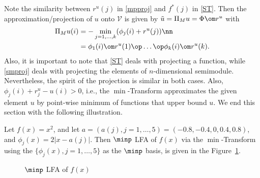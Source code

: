 Note the similarity between $r^u(j)$ in \eqref{mpproj} and $f^*(j)$ in \eqref{ST}.
Then the approximation/projection of $u$ onto $\mathcal{V}$ is given by $\tilde{u}=\Pi_M u=\Phi \om r^u$ with
\begin{align}\label{mplfa}
\Pi_M u(i)&=-\min_{j=1,\ldots,k}(\phi_j(i)+r^u(j))\nn\\
&=\phi_1(i) \om r^u(1)\op \ldots \op \phi_k(i) \om r^u(k).
\end{align}
Also, it is important to note that \eqref{ST} deals with projecting a function, while \eqref{smproj} deals with projecting the elements of $n$-dimensional semimodule. Nevertheless, the spirit of the projection is similar in both cases. Also, $\phi_j(i)+r^u_j -u(i)>0$, i.e., the $\min$-Transform approximates the given element $u$ by point-wise minimum of functions that upper bound $u$. We end this section with the following illustration.\\
\begin{example}
Let $f(x)=x^2$, and let $a=(a(j),j=1,\ldots,5)=(-0.8,-0.4,0,0.4,0.8)$, and $\phi_j(x)=2|x-a(j)|$. Then $\minp$ LFA of $f(x)$ via the $\min$-Transform using the $\{\phi_j(x),j=1,\ldots,5\}$ as the $\minp$ basis, is given in the Figure~\ref{minptrans}.
\end{example}
\begin{figure}\label{illust}
    \caption{$\minp$ LFA of $f(x)$}
    \label{minptrans}
\end{figure}
